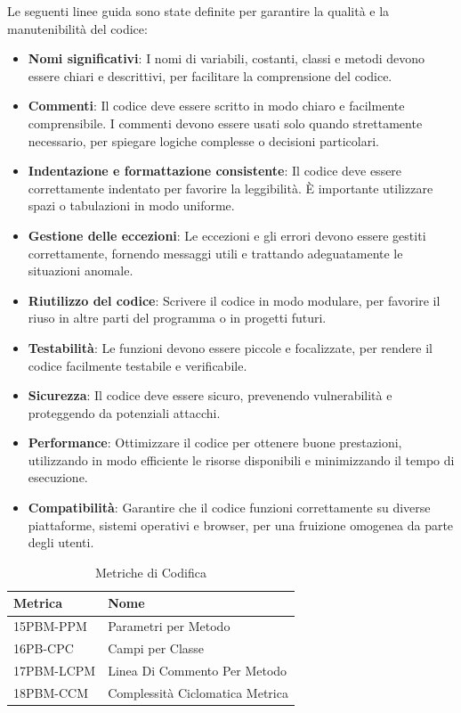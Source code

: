 Le seguenti linee guida sono state definite per garantire la qualità e la manutenibilità del codice:

\begin{itemize}
  \item \textbf{Nomi significativi}: I nomi di variabili, costanti, classi e metodi devono essere chiari e descrittivi, per facilitare la comprensione del codice.
  \item \textbf{Commenti}: Il codice deve essere scritto in modo chiaro e facilmente comprensibile. I commenti devono essere usati solo quando strettamente necessario, per spiegare logiche complesse o decisioni particolari.
  \item \textbf{Indentazione e formattazione consistente}: Il codice deve essere correttamente indentato per favorire la leggibilità. È importante utilizzare spazi o tabulazioni in modo uniforme.
  \item \textbf{Gestione delle eccezioni}: Le eccezioni e gli errori devono essere gestiti correttamente, fornendo messaggi utili e trattando adeguatamente le situazioni anomale.
  \item \textbf{Riutilizzo del codice}: Scrivere il codice in modo modulare, per favorire il riuso in altre parti del programma o in progetti futuri.
  \item \textbf{Testabilità}: Le funzioni devono essere piccole e focalizzate, per rendere il codice facilmente testabile e verificabile.
  \item \textbf{Sicurezza}: Il codice deve essere sicuro, prevenendo vulnerabilità e proteggendo da potenziali attacchi.
  \item \textbf{Performance}: Ottimizzare il codice per ottenere buone prestazioni, utilizzando in modo efficiente le risorse disponibili e minimizzando il tempo di esecuzione.
  \item \textbf{Compatibilità}: Garantire che il codice funzioni correttamente su diverse piattaforme, sistemi operativi e browser, per una fruizione omogenea da parte degli utenti.
\end{itemize}

\begin{table}[h!]
    \centering
    \renewcommand{\arraystretch}{1.5}
    \begin{tabular}{|l|l|}
        \hline
        \textbf{Metrica} & \textbf{Nome} \\
        \hline
        15PBM-PPM & Parametri per Metodo \\
        \hline
        16PB-CPC & Campi per Classe \\
        \hline
        17PBM-LCPM & Linea Di Commento Per Metodo \\
        \hline
        18PBM-CCM & Complessità Ciclomatica Metrica \\
        \hline
    \end{tabular}
    \caption{Metriche di Codifica}
    \label{tab:metriches_codifica}
\end{table}



